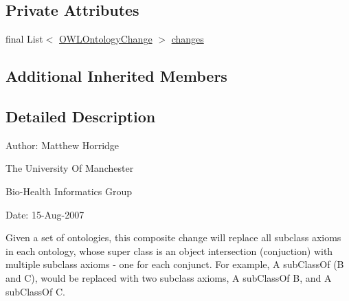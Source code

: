 \subsection*{Private Attributes}
\begin{DoxyCompactItemize}
\item 
final List$<$ \hyperlink{classorg_1_1semanticweb_1_1owlapi_1_1model_1_1_o_w_l_ontology_change}{O\-W\-L\-Ontology\-Change} $>$ \hyperlink{classorg_1_1semanticweb_1_1owlapi_1_1_split_sub_class_axioms_accc3ff191590efd507e75d5d90e85486}{changes}
\end{DoxyCompactItemize}
\subsection*{Additional Inherited Members}


\subsection{Detailed Description}
Author\-: Matthew Horridge\par
 The University Of Manchester\par
 Bio-\/\-Health Informatics Group\par
 Date\-: 15-\/\-Aug-\/2007\par
\par
 

Given a set of ontologies, this composite change will replace all subclass axioms in each ontology, whose super class is an object intersection (conjuction) with multiple subclass axioms -\/ one for each conjunct. For example, A sub\-Class\-Of (B and C), would be replaced with two subclass axioms, A sub\-Class\-Of B, and A sub\-Class\-Of C. 

